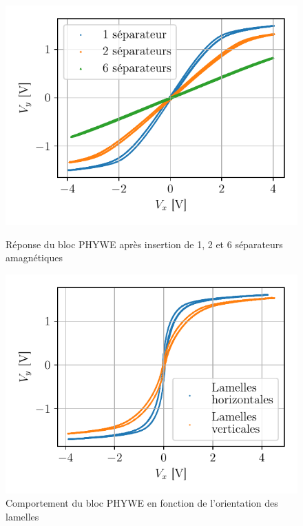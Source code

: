 \begin{figure}[h]
    \begin{minipage}{0.48\linewidth}
        \centering
        \includegraphics[width=\linewidth]{figures/separateurs_amagnetique.pdf}
        \caption{Réponse du bloc PHYWE après insertion de 1, 2 et 6 séparateurs amagnétiques}
        \label{fig:amagnetique}
    \end{minipage}
    \hfill
    \begin{minipage}{0.48\linewidth}
        \centering
        \includegraphics[width=\linewidth]{figures/vertical_vs_horizontal.pdf}
        \caption{Comportement du bloc PHYWE en fonction de l'orientation des lamelles}
        \label{fig:orientation_bloc}
    \end{minipage}
\end{figure}
    
